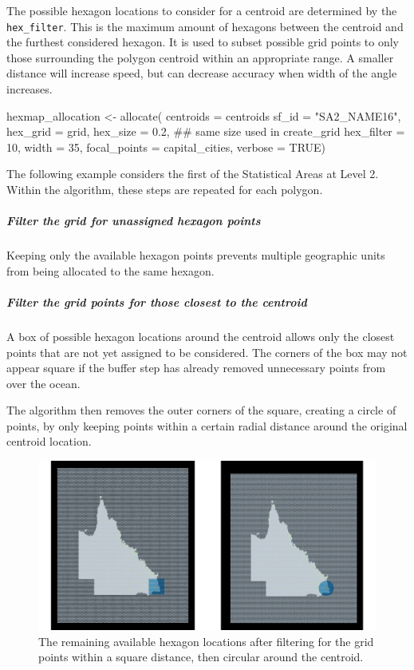 The possible hexagon locations to consider for a centroid are determined
by the \texttt{hex\_filter}. This is the maximum amount of hexagons
between the centroid and the furthest considered hexagon. It is used to
subset possible grid points to only those surrounding the polygon
centroid within an appropriate range. A smaller distance will increase
speed, but can decrease accuracy when width of the angle increases.

\begin{Schunk}
\begin{Sinput}
hexmap_allocation <- allocate(
  centroids = centroids %
  sf_id = "SA2_NAME16",
  hex_grid = grid,
  hex_size = 0.2, ## same size used in create_grid
  hex_filter = 10,
  width = 35,
  focal_points = capital_cities,
  verbose = TRUE)
\end{Sinput}
\end{Schunk}

The following example considers the first of the Statistical Areas at
Level 2. Within the algorithm, these steps are repeated for each
polygon.

\hypertarget{filter-the-grid-for-unassigned-hexagon-points}{%
\subparagraph{Filter the grid for unassigned hexagon
points}\label{filter-the-grid-for-unassigned-hexagon-points}}

Keeping only the available hexagon points prevents multiple geographic
units from being allocated to the same hexagon.

\hypertarget{filter-the-grid-points-for-those-closest-to-the-centroid}{%
\subparagraph{Filter the grid points for those closest to the
centroid}\label{filter-the-grid-points-for-those-closest-to-the-centroid}}

A box of possible hexagon locations around the centroid allows only the
closest points that are not yet assigned to be considered. The corners
of the box may not appear square if the buffer step has already removed
unnecessary points from over the ocean.

The algorithm then removes the outer corners of the square, creating a
circle of points, by only keeping points within a certain radial
distance around the original centroid location.

\begin{figure}[h]
\centering
\includegraphics[width=16cm]{figs/4grid.pdf}
\caption{\label{fig:buffers}The remaining available hexagon locations after filtering for the grid points within a square distance, then circular around the centroid.}
\end{figure}

